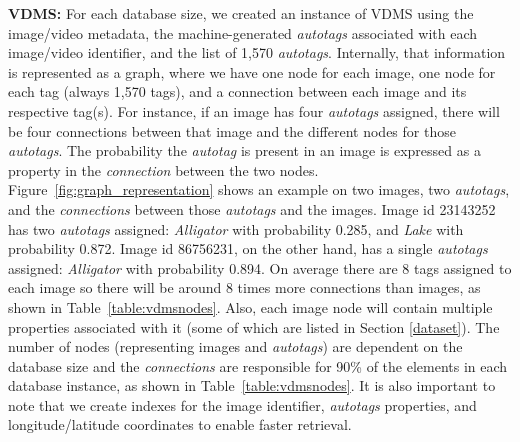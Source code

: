\textbf{VDMS:}
For each database size, we created an instance of VDMS using the image/video metadata,
the machine-generated \textit{autotags} associated with
each image/video identifier, and the list of 1,570 \textit{autotags}.
Internally, that information is represented as a graph,
where we have one node for each image, one node for each tag
(always 1,570 tags), and a connection between each image and its respective tag(s).
For instance, if an image has four \textit{autotags} assigned,
there will be four connections between that image and
the different nodes for those \textit{autotags}.
The probability the \textit{autotag} is present in an image
is expressed as a property in the \textit{connection} between the two nodes.
Figure~\ref{fig:graph_representation} shows an example on two images,
two \textit{autotags}, and the \textit{connections} between
those \textit{autotags} and the images.
Image id 23143252 has two \textit{autotags} assigned:
\textit{Alligator} with probability 0.285, and \textit{Lake} with probability 0.872.
Image id 86756231, on the other hand, has a single \textit{autotags} assigned:
\textit{Alligator} with probability 0.894.
On average there are 8 tags assigned to each image so
there will be around 8 times more connections than images, as shown
in Table~\ref{table:vdmsnodes}.
Also, each image node will contain multiple properties associated
with it (some of which are listed in Section \ref{dataset}).
The number of nodes (representing images and \textit{autotags})
are dependent on the database size and the \textit{connections} are responsible for
90\% of the elements in each database instance,
as shown in Table~\ref{table:vdmsnodes}.
It is also important to note that we create indexes for the image identifier,
\textit{autotags} properties, and longitude/latitude coordinates
to enable faster retrieval.

